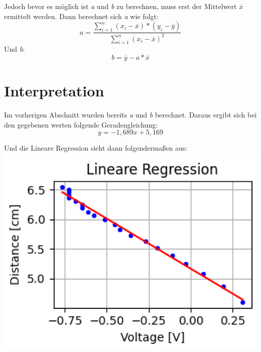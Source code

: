 Jedoch bevor es möglich ist \textit{a} und \textit{b} zu berechnen, muss erst der Mittelwert $\overline{x}$ ermittelt werden.\linebreak\linebreak
Dann berechnet sich \textit{a} wie folgt:
	\begin{equation}
	a = \dfrac{\sum\nolimits_{i=1}^n  (x_i - \overline{x}) * (y_i - \overline{y})  }{\sum\nolimits_{i=1}^n(x_i - \overline{x})^2}
	\end{equation}
Und \textit{b}:
	\begin{equation}
	b = \overline{y} - a * \overline{x}
	\end{equation}
	
	
	
\section{Interpretation}
\label{chap:VERSUCH_1_INTERPRETATION}
Im vorherigen Abschnitt wurden bereits \textit{a} und \textit{b} berechnet.
Daraus ergibt sich bei den gegebenen werten folgende Geradengleichung:
	\begin{equation*}
	y = -1,689x + 5,169
	\end{equation*}

Und die Lineare Regression sieht dann folgendermaßen aus:
		\includegraphics[scale=1]{media/linReg2.png}